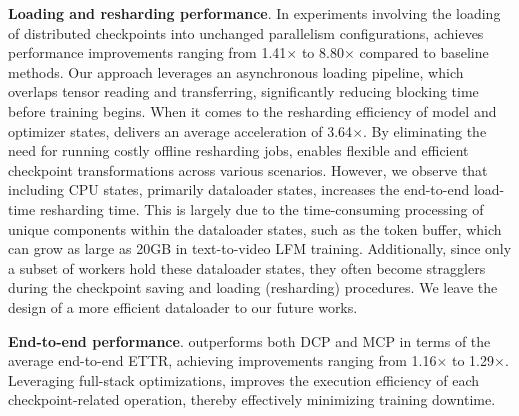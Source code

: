 \noindent \textbf{Loading and resharding performance}.
In experiments involving the loading of distributed checkpoints into unchanged parallelism configurations, \sys{} achieves performance improvements ranging from 1.41$\times$ to 8.80$\times$ compared to baseline methods.
Our approach leverages an asynchronous loading pipeline, which overlaps tensor reading and transferring, significantly reducing blocking time before training begins.
When it comes to the resharding efficiency of model and optimizer states, \sys{} delivers an average acceleration of 3.64$\times$.
By eliminating the need for running costly offline resharding jobs, \sys{} enables flexible and efficient checkpoint transformations across various scenarios.
However, we observe that including CPU states, primarily dataloader states, increases the end-to-end load-time resharding time. This is largely due to the time-consuming processing of unique components within the dataloader states, such as the token buffer, which can grow as large as 20GB in text-to-video LFM training.
Additionally, since only a subset of workers hold these dataloader states, they often become stragglers during the checkpoint saving and loading (resharding) procedures.
We leave the design of a more efficient dataloader to our future works.

\noindent \textbf{End-to-end performance}.
\sys{} outperforms both DCP and MCP in terms of the average end-to-end ETTR, achieving improvements ranging from 1.16$\times$ to 1.29$\times$.
Leveraging full-stack optimizations, \sys{} improves the execution efficiency of each checkpoint-related operation, thereby effectively minimizing training downtime.


